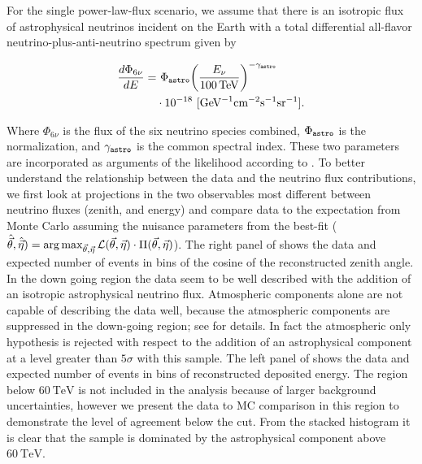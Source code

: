 For the single power-law-flux scenario, we assume that there is an isotropic flux of astrophysical neutrinos incident on the Earth with a total differential all-flavor neutrino-plus-anti-neutrino spectrum given by
\begin{linenomath*}
	\begin{gather}
	\begin{split}
	\frac{d\Phi_{6\nu}}{dE} =&{}~\Phi_\texttt{astro}{\left(\frac{E_\nu}{\SI{100}\TeV}\right)}^{-\gamma_\texttt{astro}} \\
	& \cdot 10^{-18}~[\textmd{GeV}^{-1}\textmd{cm}^{-2}\textmd{s}^{-1}\textmd{sr}^{-1}].
	\end{split}
	\label{eq:spl_flux}
	\end{gather}
\end{linenomath*}
Where $\Phi_{6\nu}$ is the flux of the six neutrino species combined, $\Phi_\texttt{astro}$ is the normalization, and $\gamma_\texttt{astro}$ is the common spectral index.
These two parameters are incorporated as arguments of the likelihood according to .
To better understand the relationship between the data and the neutrino flux contributions, we first look at projections in the two observables most different between neutrino fluxes (zenith, and energy) and compare data to the expectation from Monte Carlo assuming the nuisance parameters from the best-fit ($\hat{\vec\theta},\hat{\vec\eta})=\operatorname*{arg\,max}_{\vec\theta, \vec\eta} \mathcal{L}(\vec\theta,\vec\eta)\cdot\Pi(\vec\theta,\vec\eta)$).
The right panel of  shows the data and expected number of events in bins of the cosine of the reconstructed zenith angle.
In the down going region the data seem to be well described with the addition of an isotropic astrophysical neutrino flux.
Atmospheric components alone are not capable of describing the data well, because the atmospheric components are suppressed in the down-going region; see  for details.
In fact the atmospheric only hypothesis is rejected with respect to the addition of an astrophysical component at a level greater than $5\sigma$ with this sample.
The left panel of  shows the data and expected number of events in bins of reconstructed deposited energy.
The region below $\SI{60}\TeV$ is not included in the analysis because of larger background uncertainties, however we present the data to MC comparison in this region to demonstrate the level of agreement below the cut.
From the stacked histogram it is clear that the sample is dominated by the astrophysical component above $\SI{60}\TeV$.

